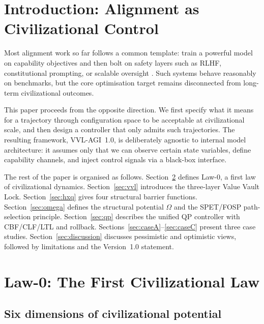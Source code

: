 \documentclass[11pt]{article}
\begin{document}
\tableofcontents
\newpage

\section{Introduction: Alignment as Civilizational Control}
\label{sec:intro}

Most alignment work so far follows a common template: train a powerful model on capability objectives and then bolt on safety layers such as RLHF, constitutional prompting, or scalable oversight \cite{Christiano2017,Ouyang2022,Bai2022}. Such systems behave reasonably on benchmarks, but the core optimisation target remains disconnected from long-term civilizational outcomes.

This paper proceeds from the opposite direction. We first specify what it means for a trajectory through configuration space to be acceptable at civilizational scale, and then design a controller that only admits such trajectories. The resulting framework, VVL-AGI~1.0, is deliberately agnostic to internal model architecture: it assumes only that we can observe certain state variables, define capability channels, and inject control signals via a black-box interface.

The rest of the paper is organised as follows. Section~\ref{sec:law0} defines Law-0, a first law of civilizational dynamics. Section~\ref{sec:vvl} introduces the three-layer Value Vault Lock. Section~\ref{sec:hxq} gives four structural barrier functions. Section~\ref{sec:omega} defines the structural potential $\Omega$ and the SPET/FOSP path-selection principle. Section~\ref{sec:qp} describes the unified QP controller with CBF/CLF/LTL and rollback. Sections~\ref{sec:caseA}--\ref{sec:caseC} present three case studies. Section~\ref{sec:discussion} discusses pessimistic and optimistic views, followed by limitations and the Version~1.0 statement.

\section{Law-0: The First Civilizational Law}
\label{sec:law0}

\subsection{Six dimensions of civilizational potential}
\end{document}
